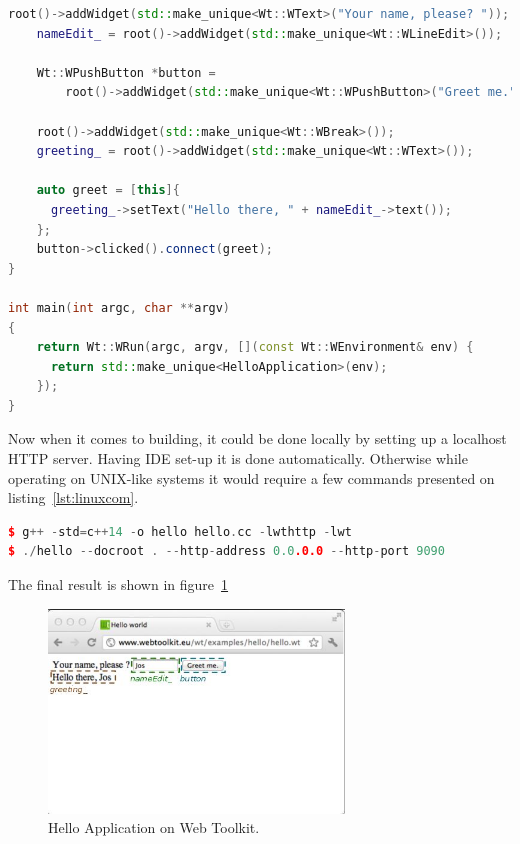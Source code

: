 \documentclass[a4paper,12pt]{book}
\begin{document}
{{\begin{lstlisting}[frame=single, label={lst:hellowtapp}, basicstyle=\small, language=C++, caption={A complete "Hello world" application \cite{helloworldapp}.}, captionpos=b]
    root()->addWidget(std::make_unique<Wt::WText>("Your name, please? "));
    nameEdit_ = root()->addWidget(std::make_unique<Wt::WLineEdit>());
    
    Wt::WPushButton *button = 
    	root()->addWidget(std::make_unique<Wt::WPushButton>("Greet me."));
    	
    root()->addWidget(std::make_unique<Wt::WBreak>());
    greeting_ = root()->addWidget(std::make_unique<Wt::WText>());
    
    auto greet = [this]{
      greeting_->setText("Hello there, " + nameEdit_->text());
    };
    button->clicked().connect(greet);
}

int main(int argc, char **argv)
{
    return Wt::WRun(argc, argv, [](const Wt::WEnvironment& env) {
      return std::make_unique<HelloApplication>(env);
    });
}
\end{lstlisting}

\newpage
Now when it comes to building, it could be done locally by setting up a localhost HTTP server. Having IDE set-up it is done automatically. Otherwise while operating on UNIX-like systems it would require a few commands presented on listing~\ref{lst:linuxcom}.

\begin{lstlisting}[frame=single,label={lst:linuxcom}, basicstyle=\small, language=C++, caption={Building "Hello world" application.}, captionpos=b]
$ g++ -std=c++14 -o hello hello.cc -lwthttp -lwt
$ ./hello --docroot . --http-address 0.0.0.0 --http-port 9090
\end{lstlisting}

\bigskip
The final result is shown in figure~\ref{fig:finalres}
\begin{figure}[h]
  \centering
    \includegraphics[width=0.7\textwidth]{hello-app}
    \caption{Hello Application on Web Toolkit.}
    \label{fig:finalres}
\end{figure}

}}
\end{document}
